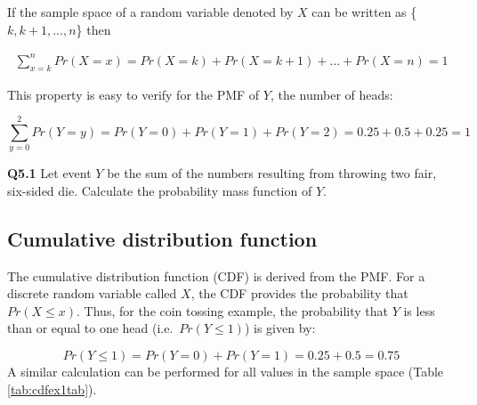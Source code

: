 \documentclass[
  oneside]{krantz}
\begin{document}
If the sample space of a random variable denoted by \(X\) can be written as \{\({k, k+1, ... , n}\)\} then

\begin{align}
\sum_{x=k}^{n} Pr(X=x) = Pr(X=k) + Pr(X=k+1) + ... + Pr(X=n) = 1
\end{align}

This property is easy to verify for the PMF of \(Y\), the number of heads:

\[\sum_{y=0}^{2} Pr(Y=y) = Pr(Y=0) + Pr(Y=1) + Pr(Y=2) = 0.25 + 0.5 + 0.25 = 1\]

\textbf{Q5.1} Let event \(Y\) be the sum of the numbers resulting from throwing two fair, six-sided die. Calculate the probability mass function of \(Y\).

\hypertarget{cumulative-distribution-function}{%
\subsection{Cumulative distribution function}\label{cumulative-distribution-function}}

The cumulative distribution function (CDF) is derived from the PMF. For a discrete random variable called \(X\), the CDF provides the probability that \(Pr(X \le x)\). Thus, for the coin tossing example, the probability that \(Y\) is less than or equal to one head (i.e.~\(Pr(Y \le 1)\)) is given by:

\[Pr(Y \le 1) = Pr(Y=0) + Pr(Y=1) = 0.25 + 0.5 = 0.75\]
A similar calculation can be performed for all values in the sample space (Table \ref{tab:cdfex1tab}).
\end{document}
